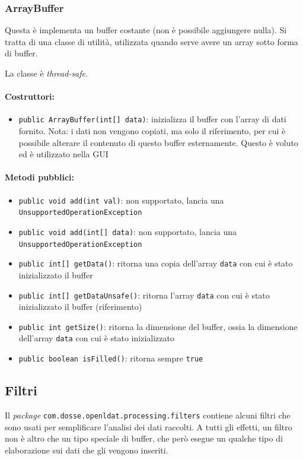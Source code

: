 \subsubsection{ArrayBuffer}
Questa è implementa un buffer costante (non è possibile aggiungere nulla). Si tratta di una classe di utilità, utilizzata quando serve avere un array sotto forma di buffer.

La classe è \textit{thread-safe}.

\paragraph{Costruttori:}\begin{itemize}
	\item \texttt{public ArrayBuffer(int[] data)}: inizializza il buffer con l'array di dati fornito. Nota: i dati non vengono copiati, ma solo il riferimento, per cui è possibile alterare il contenuto di questo buffer esternamente. Questo è voluto ed è utilizzato nella GUI
\end{itemize}

\paragraph{Metodi pubblici:}\begin{itemize}
	\item \texttt{public void add(int val)}: non supportato, lancia una \texttt{UnsupportedOperationException}
	\item \texttt{public void add(int[] data)}: non supportato, lancia una \texttt{UnsupportedOperationException}
	\item \texttt{public int[] getData()}: ritorna una copia dell'array \texttt{data} con cui è stato inizializzato il buffer
	\item \texttt{public int[] getDataUnsafe()}: ritorna l'array \texttt{data} con cui è stato inizializzato il buffer (riferimento)
	\item \texttt{public int getSize()}: ritorna la dimensione del buffer, ossia la dimensione dell'array \texttt{data} con cui è stato inizializzato
	\item \texttt{public boolean isFilled()}: ritorna sempre \texttt{true}
\end{itemize}

\subsection{Filtri}
Il \textit{package} \texttt{com.dosse.openldat.processing.filters} contiene alcuni filtri che sono usati per semplificare l'analisi dei dati raccolti. A tutti gli effetti, un filtro non è altro che un tipo speciale di buffer, che però esegue un qualche tipo di elaborazione sui dati che gli vengono inseriti.

